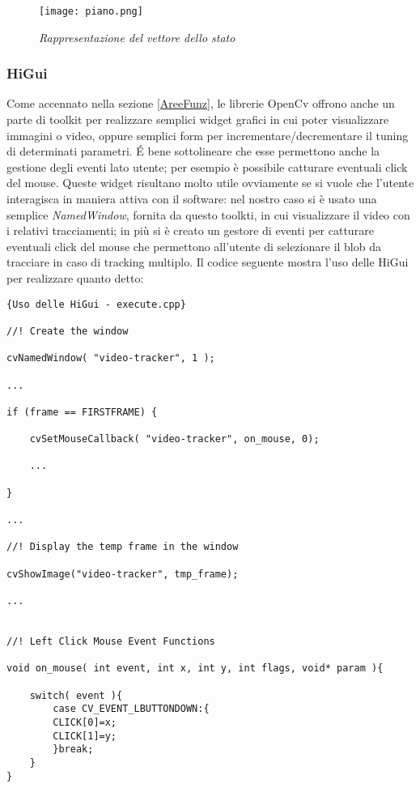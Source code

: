\begin{figure}[hbp]
\centering
	\texttt{[image: piano.png]}
\caption[Rappresentazione del vettore dello stato]{\textit{Rappresentazione del vettore dello stato}\label{fig:pianoStato}}
\end{figure}

\newpage
\subsubsection{HiGui}
Come accennato nella sezione \ref{AreeFunz}, le librerie OpenCv offrono anche un parte di toolkit per realizzare semplici widget grafici in cui poter visualizzare immagini o video, oppure semplici form per incrementare/decrementare il tuning di determinati parametri. \'E bene sottolineare che esse permettono anche la gestione degli eventi lato utente; per esempio è possibile catturare eventuali click del mouse. Queste widget risultano molto utile ovviamente se si vuole che l'utente interagisca in maniera attiva con il software: nel nostro caso si è usato una semplice \textit{NamedWindow}, fornita da questo toolkti, in cui visualizzare il video con i relativi tracciamenti; in più si è creato un gestore di eventi per catturare eventuali click del mouse che permettono all'utente di selezionare il blob da tracciare in caso di tracking multiplo.
Il codice seguente mostra l'uso delle HiGui per realizzare quanto detto:

\lstset{language=c++}
\lstset{commentstyle=\emph}
\begin{lstlisting}[frame=r,caption=Uso delle HiGui - execute.cpp ,breaklines=true,basicstyle=\small]{Uso delle HiGui - execute.cpp}

//! Create the window

cvNamedWindow( "video-tracker", 1 );

...

if (frame == FIRSTFRAME) {

	cvSetMouseCallback( "video-tracker", on_mouse, 0);
	
	...

}

...

//! Display the temp frame in the window

cvShowImage("video-tracker", tmp_frame);

...


//! Left Click Mouse Event Functions

void on_mouse( int event, int x, int y, int flags, void* param ){
 
	switch( event ){
		case CV_EVENT_LBUTTONDOWN:{
		CLICK[0]=x;
		CLICK[1]=y;
		}break;
	}
}


\end{lstlisting}
